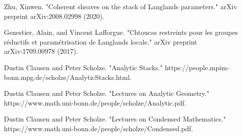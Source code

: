 \documentclass[12pt]{article}
\theoremstyle{definition}
\begin{document}
\begin{thebibliography}{}
 Zhu, Xinwen. "Coherent sheaves on the stack of Langlands parameters." arXiv preprint arXiv:2008.02998 (2020).

 Genestier, Alain, and Vincent Lafforgue. "Chtoucas restreints pour les groupes r\'eductifs et param\'etrisation de Langlands locale." arXiv preprint arXiv:1709.00978 (2017).


 Dustin Clausen and Peter Scholze. "Analytic Stacks." https://people.mpim-bonn.mpg.de/scholze/AnalyticStacks.html.

 Dustin Clausen and Peter Scholze. "Lectures on Analytic Geometry." https://www.math.uni-bonn.de/people/scholze/Analytic.pdf.

 Dustin Clausen and Peter Scholze. "Lectures on Condensed Mathematics." https://www.math.uni-bonn.de/people/scholze/Condensed.pdf.
\end{thebibliography}
\end{document}
